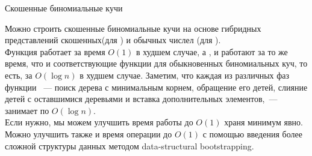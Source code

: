 \begin{frame}[fragile]{Скошенные биномиальные кучи}

Можно строить скошенные биномиальные кучи на основе гибридных представлений скошенных(для ) и обычных числел (для ).\\


Функция  работает за время $O(1)$ в худшем случае, а
,  и 
работают за то же время, что и соответствующие функции для
обыкновенных биномиальных куч, то есть, за $O(\log n)$ в худшем
случае. Заметим, что каждая из различных фаз функции ~---
поиск дерева с минимальным корнем, обращение его детей, слияние детей
с оставшимися деревьями и вставка дополнительных элементов,~---
занимает по $O(\log n)$.\\

Если нужно, мы можем улучшить время работы  до
$O(1)$ храня минимум явно.\\


Можно улучшить также и время операции  до $O(1)$ с помощью
введения более сложной структуры данных методом data-structural bootstrapping.
\end{frame}


